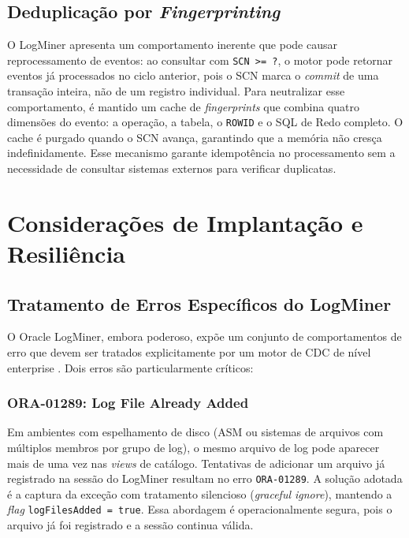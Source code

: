 \documentclass[12pt]{article}
\begin{document}
\subsection{Deduplicação por \textit{Fingerprinting}}
\label{subsec:dedup}

O LogMiner apresenta um comportamento inerente que pode causar reprocessamento
de eventos: ao consultar com \texttt{SCN >= ?}, o motor pode retornar eventos
já processados no ciclo anterior, pois o SCN marca o \textit{commit} de uma
transação inteira, não de um registro individual. Para neutralizar esse
comportamento, é mantido um cache de \textit{fingerprints} que combina quatro
dimensões do evento: a operação, a tabela, o \texttt{ROWID} e o SQL de Redo
completo. O cache é purgado quando o SCN avança, garantindo que a memória
não cresça indefinidamente. Esse mecanismo garante idempotência no
processamento sem a necessidade de consultar sistemas externos para verificar
duplicatas.


\section{Considerações de Implantação e Resiliência}
\label{sec:deployment}

\subsection{Tratamento de Erros Específicos do LogMiner}

O Oracle LogMiner, embora poderoso, expõe um conjunto de comportamentos de
erro que devem ser tratados explicitamente por um motor de CDC de nível
enterprise \cite{oracle:2023}. Dois erros são particularmente críticos:

\subsubsection{ORA-01289: Log File Already Added}

Em ambientes com espelhamento de disco (ASM ou sistemas de arquivos com
múltiplos membros por grupo de log), o mesmo arquivo de log pode aparecer
mais de uma vez nas \textit{views} de catálogo. Tentativas de adicionar
um arquivo já registrado na sessão do LogMiner resultam no erro
\texttt{ORA-01289}. A solução adotada é a captura da exceção com tratamento
silencioso (\textit{graceful ignore}), mantendo a \textit{flag}
\texttt{logFilesAdded = true}. Essa abordagem é operacionalmente segura,
pois o arquivo já foi registrado e a sessão continua válida.
\end{document}

